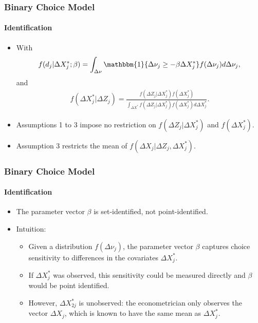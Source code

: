 \begin{frame}
\frametitle{Binary Choice Model}
\framesubtitle{Identification}

\begin{itemize}
	\item With
	\begin{align*}
	f(d_{j}|\Delta X^{*}_{j};\beta)=\int_{\Delta\nu}\mathbbm{1}\{\Delta\nu_{j}\geq-\beta\Delta X^{*}_{j}\}f(\Delta\nu_{j})d\Delta\nu_{j},
	\end{align*}
	and
	\begin{align*}
	f(\Delta X^{*}_{j}|\Delta Z_{j})=\frac{f(\Delta Z_{j}|\Delta X^{*}_{j})f(\Delta X^{*}_{j})}{\int_{\Delta X^{*}}f(\Delta Z_{j}|\Delta X^{*}_{j})f(\Delta X^{*}_{j})d\Delta X^{*}_{j}}.
	\end{align*}
	\item Assumptions 1 to 3 impose no restriction on $f(\Delta Z_{j}|\Delta X^{*}_{j})$ and $f(\Delta X^{*}_{j})$.
	\item Assumption 3 restricts the mean of $f(\Delta X_{j}|\Delta Z_{j},\Delta X^{*}_{j})$.
\end{itemize}
\end{frame}

\begin{frame}
\frametitle{Binary Choice Model}
\framesubtitle{Identification}

\begin{itemize}
	\item The parameter vector $\beta$ is set-identified, not point-identified.
	\item Intuition:
	\begin{itemize}
		\item Given a distribution $f(\Delta\nu_{j})$, the parameter vector $\beta$ captures choice sensitivity to differences in the covariates $\Delta X^{*}_{j}$.
		\item If $\Delta X^{*}_{j}$ was observed, this sensitivity could be measured directly and $\beta$ would be point identified.
		\item However, $\Delta X^{*}_{2j}$ is unobserved: the econometrician only observes the vector $\Delta X_{j}$, which is known to have the same mean as $\Delta X^{*}_{j}$.
	\end{itemize}
\end{itemize}
\end{frame}

